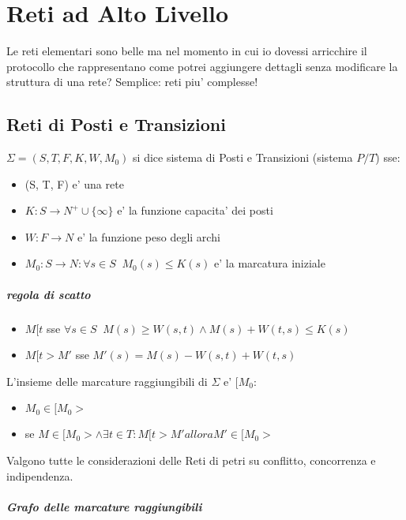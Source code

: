 \chapter{Reti ad Alto Livello}

Le reti elementari sono belle ma nel momento in cui io dovessi arricchire il protocollo che rappresentano come potrei aggiungere dettagli senza modificare la struttura di una rete?
Semplice: reti piu' complesse!

\section{Reti di Posti e Transizioni}

$\Sigma  = (S, T, F, K, W, M_0)$ si dice sistema di Posti e Transizioni (sistema $P/T$) sse:
\begin{itemize}
    \item (S, T, F) e' una rete
    \item $K : S \rightarrow N^+ \cup \{\infty\}$ e' la funzione capacita' dei posti
    \item $W : F \rightarrow N$ e' la funzione peso degli archi
    \item $M_0 : S \rightarrow N : \forall s \in S \;\; M_0(s) \leq K(s)$ e' la marcatura iniziale
\end{itemize}

\paragraph{regola di scatto}

\begin{itemize}
    \item $M[t$ sse $\forall s \in S \;\; M(s) \geq W(s, t) \land M(s) + W(t, s) \leq K(s)$
    \item $M[t > M'$ sse $M'(s) = M(s) - W(s, t) + W(t, s)$
\end{itemize}

L'insieme delle marcature raggiungibili di $\Sigma$ e' $[M_0$:
\begin{itemize}
    \item $M_0 \in [M_0 >$
    \item se $M \in [M_0 > \land \exists t \in T : M[t > M' allora M' \in [M_0 >$
\end{itemize}

Valgono tutte le considerazioni delle Reti di petri su conflitto, concorrenza e indipendenza.

\paragraph{Grafo delle marcature raggiungibili}


